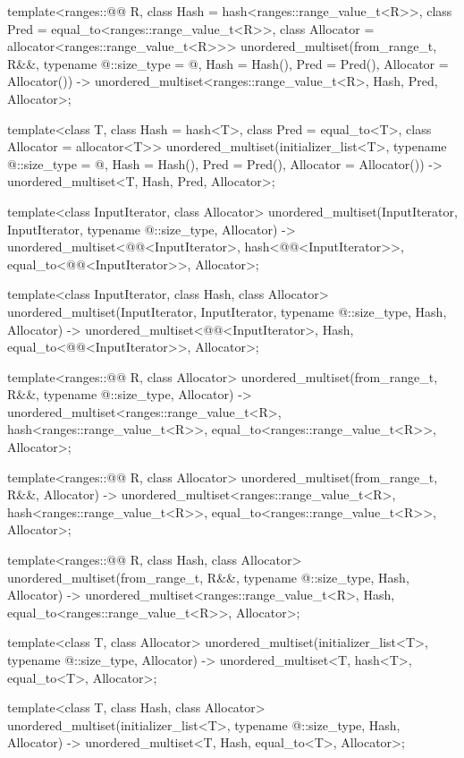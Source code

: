 \begin{codeblock}
{  template<ranges::@@ R,
           class Hash = hash<ranges::range_value_t<R>>,
           class Pred = equal_to<ranges::range_value_t<R>>,
           class Allocator = allocator<ranges::range_value_t<R>>>
    unordered_multiset(from_range_t, R&&, typename @\seebelow@::size_type = @\seebelow@,
                       Hash = Hash(), Pred = Pred(), Allocator = Allocator())
      -> unordered_multiset<ranges::range_value_t<R>, Hash, Pred, Allocator>;

  template<class T, class Hash = hash<T>,
           class Pred = equal_to<T>, class Allocator = allocator<T>>
    unordered_multiset(initializer_list<T>, typename @\seebelow@::size_type = @\seebelow@,
                       Hash = Hash(), Pred = Pred(), Allocator = Allocator())
      -> unordered_multiset<T, Hash, Pred, Allocator>;

  template<class InputIterator, class Allocator>
    unordered_multiset(InputIterator, InputIterator, typename @\seebelow@::size_type, Allocator)
      -> unordered_multiset<@@<InputIterator>,
                            hash<@@<InputIterator>>,
                            equal_to<@@<InputIterator>>,
                            Allocator>;

  template<class InputIterator, class Hash, class Allocator>
    unordered_multiset(InputIterator, InputIterator, typename @\seebelow@::size_type,
                       Hash, Allocator)
      -> unordered_multiset<@@<InputIterator>, Hash,
                            equal_to<@@<InputIterator>>,
                            Allocator>;

  template<ranges::@@ R, class Allocator>
    unordered_multiset(from_range_t, R&&, typename @\seebelow@::size_type, Allocator)
      -> unordered_multiset<ranges::range_value_t<R>, hash<ranges::range_value_t<R>>,
                            equal_to<ranges::range_value_t<R>>, Allocator>;

  template<ranges::@@ R, class Allocator>
    unordered_multiset(from_range_t, R&&, Allocator)
      -> unordered_multiset<ranges::range_value_t<R>, hash<ranges::range_value_t<R>>,
                            equal_to<ranges::range_value_t<R>>, Allocator>;

  template<ranges::@@ R, class Hash, class Allocator>
    unordered_multiset(from_range_t, R&&, typename @\seebelow@::size_type, Hash, Allocator)
      -> unordered_multiset<ranges::range_value_t<R>, Hash, equal_to<ranges::range_value_t<R>>,
                            Allocator>;

  template<class T, class Allocator>
    unordered_multiset(initializer_list<T>, typename @\seebelow@::size_type, Allocator)
      -> unordered_multiset<T, hash<T>, equal_to<T>, Allocator>;

  template<class T, class Hash, class Allocator>
    unordered_multiset(initializer_list<T>, typename @\seebelow@::size_type, Hash, Allocator)
      -> unordered_multiset<T, Hash, equal_to<T>, Allocator>;
}
\end{codeblock}

